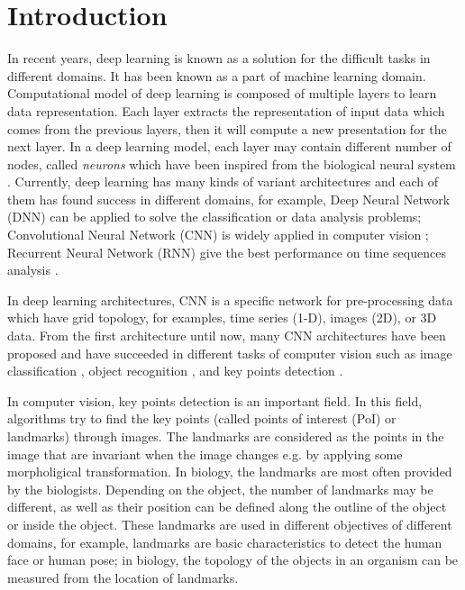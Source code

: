 \documentclass[review]{elsarticle}
\begin{document}
\linenumbers

\section{Introduction}
\label{sIntroduction}
In recent years, deep learning \cite{lecun2015deep} is known as a solution for the difficult tasks in different domains. It has been known as a part of machine learning domain. Computational model of deep learning is composed of multiple layers to learn data representation. Each layer extracts the representation of input data which comes from the previous layers, then it will compute a new presentation for the next layer. In a deep learning model, each layer may contain different number of nodes, called \textit{neurons} which have been inspired from the biological neural system \cite{arbib2012brains}. Currently, deep learning has many kinds of variant architectures and each of them has found success in different domains, for example,  Deep Neural Network (DNN) can be applied to solve the classification or data analysis problems\cite{hinton2012deep, mikolov2011strategies}; Convolutional Neural Network (CNN) is widely applied in computer vision \cite{lecun1998gradient, krizhevsky2012imagenet,szegedy2015going}; Recurrent Neural Network (RNN) give the best performance on time sequences analysis \cite{jean2014using, sutskever2014sequence,lecun2015deep, collobert2011natural}.

In deep learning architectures, CNN is a specific network for pre-processing data which have grid topology, for examples, time series (1-D), images (2D), or 3D data. From the first architecture \cite{lecun1998gradient} until now, many CNN architectures have been proposed and have succeeded in different tasks of computer vision such as image classification \cite{lecun1998gradient, krizhevsky2012imagenet,szegedy2015going}, object recognition \cite{szegedy2015going,farabet2013learning,li2015convolutional}, and key points detection \cite{liu2016fashion, sun2013deep, zhang2014facial, cintas2016automatic}.

In computer vision, key points detection is an important field. In this field, algorithms try to find the key points (called points of interest (PoI) or landmarks) through images. The landmarks are considered as the points in the image that are invariant when the image changes e.g. by applying some morpholigical transformation. In biology, the landmarks are most often provided by the biologists. Depending on the object, the number of landmarks may be different, as well as their position can be defined along the outline of the object or inside the object. These landmarks are used in different objectives of different domains, for example, landmarks are basic characteristics to detect the human face or human pose; in biology, the topology of the objects in an organism can be measured from the location of landmarks.
\end{document}
